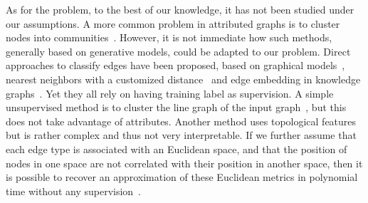 As for the \ecp{} problem, to the best of our knowledge, it has not been studied under our
assumptions. A more common problem in attributed graphs is to cluster nodes into
communities~\autocites{LeskovecEgo12}{Yang2013}{Xu2014}{ZhangModelFree16}. However, it is not
immediate how such methods, generally based on generative models, could be adapted to our problem.
Direct approaches to classify edges have been proposed, based on graphical
models~\autocite{graphicalModelTies11}, nearest neighbors with a customized
distance~\autocite{Aggarwal2016a} and edge embedding in knowledge graphs~\autocite{transE13}. Yet
they all rely on having training label as supervision. A simple unsupervised method is to cluster
the line graph of the input graph~\autocite{LineGraph09}, but this does not take advantage of
attributes. Another method uses topological features~\autocite{ahmed2017roles} but is rather complex
and thus not very interpretable. If we further assume that each edge type is associated with an
Euclidean space, and that the position of nodes in one space are not correlated with their position
in another space, then it is possible to recover an approximation of these Euclidean metrics in
polynomial time without any supervision~\autocite{Abraham2012a}.
